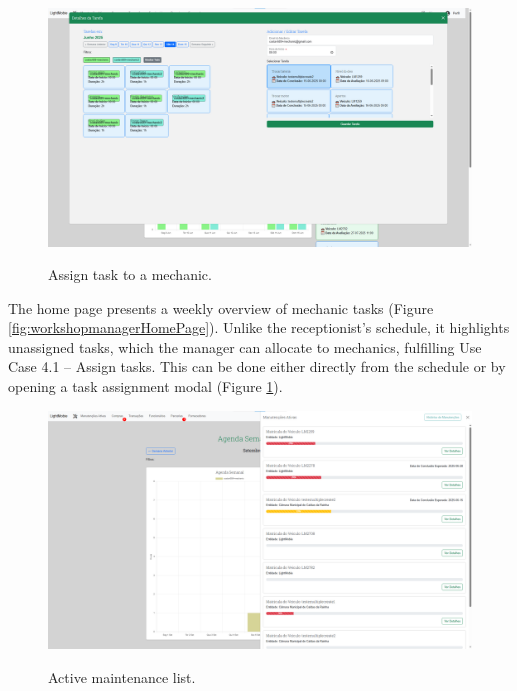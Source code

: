 \begin{figure}[h]
  \caption{Assign task to a mechanic.}
  \centering
  \includegraphics[width=\textwidth]{figs/Implementation/workshopmanager/addTask}
  \label{fig:workshopmanagerAssignTask}
\end{figure}



The home page presents a weekly overview of mechanic tasks (Figure \ref{fig:workshopmanagerHomePage}). Unlike the receptionist's schedule, it highlights unassigned tasks, which the manager can allocate to mechanics, fulfilling Use Case 4.1 – Assign tasks. This can be done either directly from the schedule or by opening a task assignment modal (Figure \ref{fig:workshopmanagerAssignTask}).



\begin{figure}[h]
  \caption{Active maintenance list.}
  \centering
  \includegraphics[width=\textwidth]{figs/Implementation/workshopmanager/maintenanceList}
  \label{fig:workshopmanagerMaintenanceList}
\end{figure}



